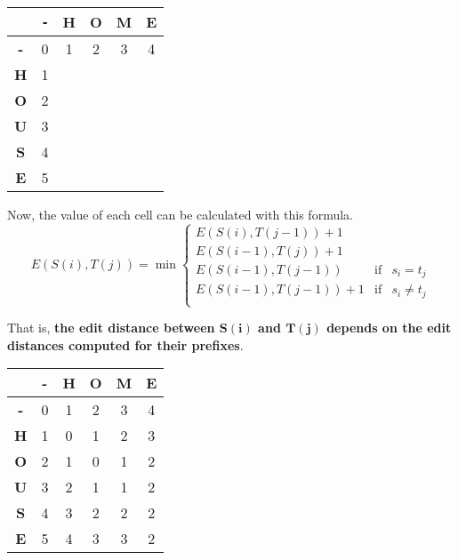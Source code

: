 \documentclass[../main.tex]{subfiles}
\begin{document}
\begin{center}
	\begin{tabular}{|c|c|c|c|c|c|}
		\hline
		           & \texttt{-} & \textbf{H} & \textbf{O} & \textbf{M} & \textbf{E} \\
		\hline
		\textbf{-} & 0          & 1          & 2          & 3          & 4          \\
		\hline
		\textbf{H} & 1          &            &            &            &            \\
		\hline
		\textbf{O} & 2          &            &            &            &            \\
		\hline
		\textbf{U} & 3          &            &            &            &            \\
		\hline
		\textbf{S} & 4          &            &            &            &            \\
		\hline
		\textbf{E} & 5          &            &            &            &            \\
		\hline
	\end{tabular}
\end{center}

Now, the value of each cell can be calculated with this formula.
$$
	E(S(i), T(j)) = \min \left\{\begin{array}{rcl}
		E(S(i), T(j-1)) + 1                             \\
		E(S(i-1), T(j)) + 1                             \\
		E(S(i-1), T(j-1))    & \mbox{if} & s_i = t_j    \\
		E(S(i-1), T(j-1)) +1 & \mbox{if} & s_i \neq t_j \\
	\end{array}
	\right.
$$

That is, \textbf{the edit distance between $\mathbf{S(i)}$ and $\mathbf{T(j)}$ depends on the edit distances computed for their prefixes}.

\begin{center}
	\begin{tabular}{|c|c|c|c|c|c|}
		\hline
		           & \textbf{-} & \textbf{H} & \textbf{O} & \textbf{M} & \textbf{E}             \\
		\hline
		\textbf{-} & 0          & 1          & 2          & 3          & 4                      \\
		\hline
		\textbf{H} & 1          & 0          & 1          & 2          & 3                      \\
		\hline
		\textbf{O} & 2          & 1          & 0          & 1          & 2                      \\
		\hline
		\textbf{U} & 3          & 2          & 1          & 1          & 2                      \\
		\hline
		\textbf{S} & 4          & 3          & 2          & 2          & 2                      \\
		\hline
		\textbf{E} & 5          & 4          & 3          & 3          & \cellcolor[gray]{0.9}2 \\
		\hline
	\end{tabular}
\end{center}
\end{document}
